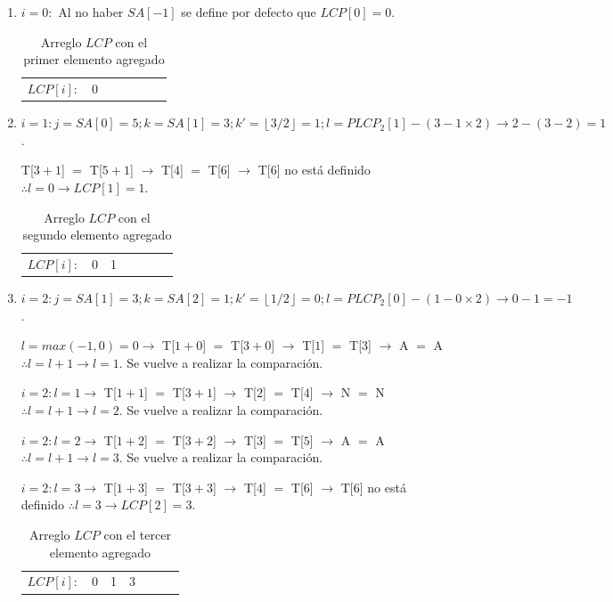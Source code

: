 \begin{enumerate}

\item $i=0:$ Al no haber $SA[-1]$ se define por defecto que $LCP[0] = 0$.

\begin{table}[!htb]
\centering
\begin{tabular}{c|c|c|c|c|c|c|}
\cline{2-7}
$LCP[i]:$ & 0 &  &  &  &  & \\ \cline{2-7}
\end{tabular}
\caption{Arreglo $LCP$ con el primer elemento agregado}
\end{table}

\item $i=1: j=SA[0]=5; k=SA[1]=3; k'= \left \lfloor{3/2}\right \rfloor = 1; l= PLCP_{2}[1] - (3-1 \times 2) \rightarrow 2-(3-2)=1$.

T[$3+1$] $=$ T[$5+1$] $\rightarrow$ T[$4$] $=$ T[$6$] $\rightarrow$ T[$6$] no está definido $\therefore l=0 \rightarrow LCP[1] = 1$.

\begin{table}[!htb]
\centering
\begin{tabular}{c|c|c|c|c|c|c|}
\cline{2-7}
$LCP[i]:$ & 0 & 1 &  &  &  & \\ \cline{2-7}
\end{tabular}
\caption{Arreglo $LCP$ con el segundo elemento agregado}
\end{table}

\item $i=2: j=SA[1]=3; k=SA[2]=1; k'= \left \lfloor{1/2}\right \rfloor = 0; l= PLCP_{2}[0] - (1-0 \times 2) \rightarrow 0-1=-1$.

$l=max(-1,0)=0 \rightarrow$ T[$1+0$] $=$ T[$3+0$] $\rightarrow$ T[$1$] $=$ T[$3$] $\rightarrow$ A $=$ A $\therefore l=l+1 \rightarrow l=1$. Se vuelve a realizar la comparación.

$i=2: l=1 \rightarrow$ T[$1+1$] $=$ T[$3+1$] $\rightarrow$ T[$2$] $=$ T[$4$] $\rightarrow$ N $=$ N $\therefore l=l+1 \rightarrow l=2$. Se vuelve a realizar la comparación.

$i=2: l=2 \rightarrow$ T[$1+2$] $=$ T[$3+2$] $\rightarrow$ T[$3$] $=$ T[$5$] $\rightarrow$ A $=$ A $\therefore l=l+1 \rightarrow l=3$. Se vuelve a realizar la comparación.

$i=2: l=3 \rightarrow$ T[$1+3$] $=$ T[$3+3$] $\rightarrow$ T[$4$] $=$ T[$6$] $\rightarrow$ T[$6$] no está definido $\therefore l=3 \rightarrow LCP[2] = 3$.

\begin{table}[!htb]
\centering
\begin{tabular}{c|c|c|c|c|c|c|}
\cline{2-7}
$LCP[i]:$ & 0 & 1 & 3 &  &  & \\ \cline{2-7}
\end{tabular}
\caption{Arreglo $LCP$ con el tercer elemento agregado}
\end{table}


\end{enumerate}
